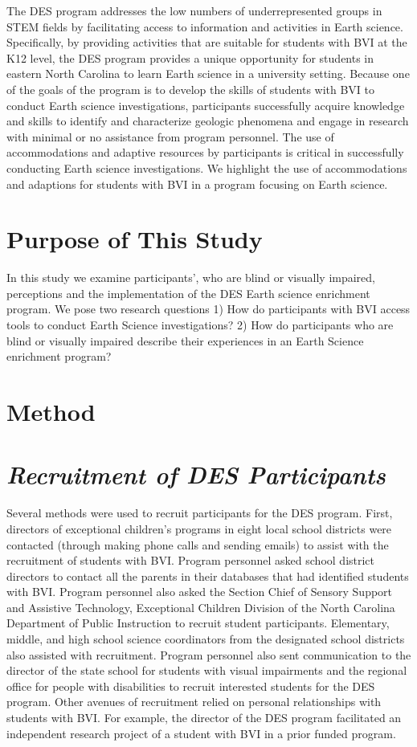 \documentclass[11pt]{sig-alternate}
\begin{document}
\begin{large}
The DES program addresses the low numbers of underrepresented groups in STEM fields by facilitating access to information and activities in Earth science. Specifically, by providing activities that are suitable for students with BVI at the K12 level, the DES program provides a unique opportunity for students in eastern North Carolina to learn Earth science in a university setting. Because one of the goals of the program is to develop the skills of students with BVI to conduct Earth science investigations, participants successfully acquire knowledge and skills to identify and characterize geologic phenomena and engage in research with minimal or no assistance from program personnel. The use of accommodations and adaptive resources by participants is critical in successfully conducting Earth science investigations.  We highlight the use of accommodations and adaptions for students with BVI in a program focusing on Earth science.

\section*{Purpose of This Study}
In this study we examine participants’, who are blind or visually impaired, perceptions and the implementation of the DES Earth science enrichment program. We pose two research questions 1) How do participants with BVI access tools to conduct Earth Science investigations? 2) How do participants who are blind or visually impaired describe their experiences in an Earth Science enrichment program?

\section*{Method}
\section*{\textit{Recruitment of DES Participants}}
Several methods were used to recruit participants for the DES program. First, directors of exceptional children’s programs in eight local school districts were contacted (through making phone calls and sending emails) to assist with the recruitment of students with BVI. Program personnel asked school district directors to contact all the parents in their databases that had identified students with BVI. Program personnel also asked the Section Chief of Sensory Support and Assistive Technology, Exceptional Children Division of the North Carolina Department of Public Instruction to recruit student participants.  Elementary, middle, and high school science coordinators from the designated school districts also assisted with recruitment. Program personnel also sent communication to the director of the state school for students with visual impairments and the regional office for people with disabilities to recruit interested students for the DES program. Other avenues of recruitment relied on personal relationships with students with BVI. For example, the director of the DES program facilitated an independent research project of a student with BVI in a prior funded program. 


\end{large}
\end{document}

